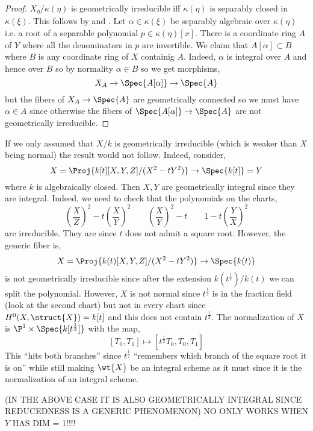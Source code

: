 \documentclass[12pt]{article}
\begin{document}
\begin{proof}
$X_{\eta} / \kappa(\eta)$ is geometrically irreducible iff $\kappa(\eta)$ is separably closed in $\kappa(\xi)$. This follows by  and . Let $\alpha \in \kappa(\xi)$ be separably algebraic over $\kappa(\eta)$ i.e. a root of a separable polynomial $p \in \kappa(\eta)[x]$. There is a coordinate ring $A$ of $Y$ where all the denominators in $p$ are invertible. We claim that $A[\alpha] \subset B$ where $B$ is any coordinate ring of $X$ containig $A$. Indeed, $\alpha$ is integral over $A$ and hence over $B$ so by normality $\alpha \in B$ so we get morphisms,
\[ X_A \to \Spec{A[\alpha]} \to \Spec{A} \]
but the fibers of $X_A \to \Spec{A}$ are geometrically connected so we must have $\alpha \in A$ since otherwise the fibers of $\Spec{A[\alpha]} \to \Spec{A}$ are not geometrically irreducible.
\end{proof}

\begin{rmk}
If we only assumed that $X / k$ is geometrically irreducible (which is weaker than $X$ being normal) the result would not follow. Indeed, consider,
\[ X = \Proj{k[t][X,Y,Z]/(X^2 - t Y^2)} \to \Spec{k[t]} = Y \]
where $k$ is algebraically closed. Then $X, Y$ are geometrically integral since they are integral. Indeed, we need to check that the polynomials on the charts,
\[ \left( \frac{X}{Z} \right)^2 - t \left( \frac{X}{Y} \right)^2 \quad \quad \left( \frac{X}{Y} \right)^2 - t \quad \quad 1 - t \left( \frac{Y}{X} \right)^2 \]
are irreducible. They are since $t$ does not admit a square root. However, the generic fiber is,
\[ X = \Proj{k(t)[X,Y,Z]/(X^2 - t Y^2)} \to \Spec{k(t)} \]
is not geometrically irreducible since after the extension $k(t^{\frac{1}{2}}) / k(t)$ we can split the polynomial. However, $X$ is not normal since $t^{\frac{1}{2}}$ is in the fraction field (look at the second chart) but not in every chart since $H^0(X, \struct{X}) = k[t]$ and this does not contain $t^{\frac{1}{2}}$. The normalization of $X$ is $\P^1 \times \Spec{k[t^{\frac{1}{2}}]}$ with the map,
\[ [T_0, T_1] \mapsto [t^{\frac{1}{2}} T_0, T_0, T_1] \]
This ``hits both branches'' since $t^{\frac{1}{2}}$ ``remembers which branch of the square root it is on'' while still making $\wt{X}$ be an integral scheme as it must since it is the normalization of an integral scheme.
\end{rmk}


(IN THE ABOVE CASE IT IS ALSO GEOMETRICALLY INTEGRAL SINCE REDUCEDNESS IS A GENERIC PHENOMENON) NO ONLY WORKS WHEN $Y$ HAS DIM = 1!!!!
\end{document}
